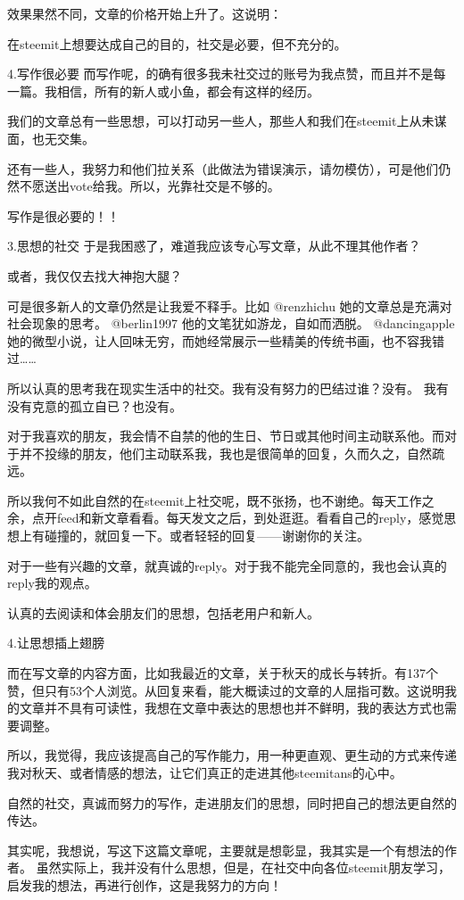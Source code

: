 \documentclass[]{ctexbook}
\begin{document}
效果果然不同，文章的价格开始上升了。这说明：

在steemit上想要达成自己的目的，社交是必要，但不充分的。

4.写作很必要
而写作呢，的确有很多我未社交过的账号为我点赞，而且并不是每一篇。我相信，所有的新人或小鱼，都会有这样的经历。

我们的文章总有一些思想，可以打动另一些人，那些人和我们在steemit上从未谋面，也无交集。

还有一些人，我努力和他们拉关系（此做法为错误演示，请勿模仿），可是他们仍然不愿送出vote给我。所以，光靠社交是不够的。

写作是很必要的！！

3.思想的社交
于是我困惑了，难道我应该专心写文章，从此不理其他作者？

或者，我仅仅去找大神抱大腿？

可是很多新人的文章仍然是让我爱不释手。比如 @renzhichu 她的文章总是充满对社会现象的思考。 @berlin1997 他的文笔犹如游龙，自如而洒脱。 @dancingapple 她的微型小说，让人回味无穷，而她经常展示一些精美的传统书画，也不容我错过\ldots{}\ldots{}

所以认真的思考我在现实生活中的社交。我有没有努力的巴结过谁？没有。 我有没有克意的孤立自已？也没有。

对于我喜欢的朋友，我会情不自禁的他的生日、节日或其他时间主动联系他。而对于并不投缘的朋友，他们主动联系我，我也是很简单的回复，久而久之，自然疏远。

所以我何不如此自然的在steemit上社交呢，既不张扬，也不谢绝。每天工作之余，点开feed和新文章看看。每天发文之后，到处逛逛。看看自己的reply，感觉思想上有碰撞的，就回复一下。或者轻轻的回复------谢谢你的关注。

对于一些有兴趣的文章，就真诚的reply。对于我不能完全同意的，我也会认真的reply我的观点。

认真的去阅读和体会朋友们的思想，包括老用户和新人。

4.让思想插上翅膀

而在写文章的内容方面，比如我最近的文章，关于秋天的成长与转折。有137个赞，但只有53个人浏览。从回复来看，能大概读过的文章的人屈指可数。这说明我的文章并不具有可读性，我想在文章中表达的思想也并不鲜明，我的表达方式也需要调整。

所以，我觉得，我应该提高自己的写作能力，用一种更直观、更生动的方式来传递我对秋天、或者情感的想法，让它们真正的走进其他steemitans的心中。

自然的社交，真诚而努力的写作，走进朋友们的思想，同时把自己的想法更自然的传达。

其实呢，我想说，写这下这篇文章呢，主要就是想彰显，我其实是一个有想法的作者。
虽然实际上，我并没有什么思想，但是，在社交中向各位steemit朋友学习，启发我的想法，再进行创作，这是我努力的方向！
\end{document}
